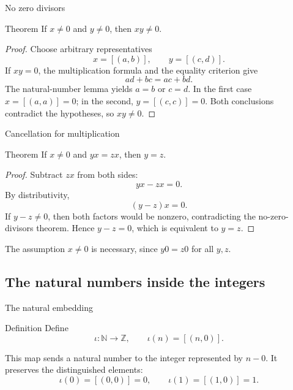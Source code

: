\documentclass[aspectratio=169,11pt]{beamer}
\newcommand{\N}{\mathbb N}
\newcommand{\Z}{\mathbb Z}
\newcommand{\cl}[2]{\left[(#1,#2)\right]}
\begin{document}
\begin{frame}{No zero divisors}
  \begin{block}{Theorem}
    If \(x\ne0\) and \(y\ne0\), then \(xy\ne0\).
  \end{block}

  \begin{proof}
    Choose arbitrary representatives
    \[
      x=\cl{a}{b},
      \qquad
      y=\cl{c}{d}.
    \]
    If \(xy=0\), the multiplication formula and the equality criterion give
    \[
      ad+bc=ac+bd.
    \]
    The natural-number lemma yields \(a=b\) or \(c=d\).  In the first case
    \(x=\cl{a}{a}=0\); in the second, \(y=\cl{c}{c}=0\).  Both conclusions
    contradict the hypotheses, so \(xy\ne0\).
  \end{proof}
\end{frame}

\begin{frame}{Cancellation for multiplication}
  \begin{block}{Theorem}
    If \(x\ne0\) and \(yx=zx\), then \(y=z\).
  \end{block}

  \begin{proof}
    Subtract \(zx\) from both sides:
    \[
      yx-zx=0.
    \]
    By distributivity,
    \[
      (y-z)x=0.
    \]
    If \(y-z\ne0\), then both factors would be nonzero, contradicting the
    no-zero-divisors theorem.  Hence \(y-z=0\), which is equivalent to \(y=z\).
  \end{proof}

  The assumption \(x\ne0\) is necessary, since \(y0=z0\) for all \(y,z\).
\end{frame}

\subsection{The natural numbers inside the integers}

\begin{frame}{The natural embedding}
  \begin{block}{Definition}
    Define
    \[
      \iota\colon\N\longrightarrow\Z,
      \qquad
      \iota(n)=\cl{n}{0}.
    \]
  \end{block}

  This map sends a natural number to the integer represented by \(n-0\).
  It preserves the distinguished elements:
  \[
    \iota(0)=\cl{0}{0}=0,
    \qquad
    \iota(1)=\cl{1}{0}=1.
  \]
\end{frame}
\end{document}
